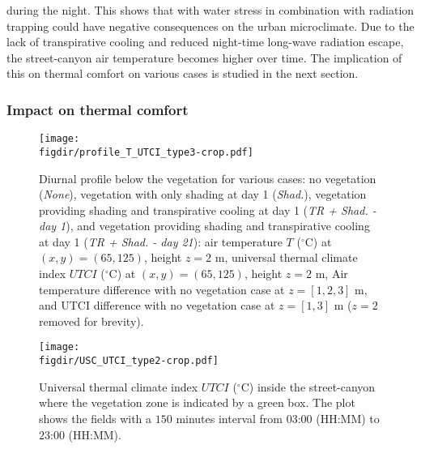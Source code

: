 during the night. This shows that with water stress in combination with radiation trapping could have negative consequences on the urban microclimate. Due to the lack of transpirative cooling and reduced night-time long-wave radiation escape, the street-canyon air temperature becomes higher over time. The implication of this on thermal comfort on various cases is studied in the next section.
	
	
%
%
%
%


\subsubsection*{Impact on thermal comfort}

\begin{figure}[p]
	\centering
	\texttt{[image: \\figdir/profile\_T\_UTCI\_type3-crop.pdf]}
	\caption{Diurnal profile below the vegetation for various cases: no vegetation (\textit{None}), vegetation with only shading at day 1 (\textit{Shad.}), vegetation providing shading and transpirative cooling at day 1 (\textit{TR + Shad. - day 1}), and vegetation providing shading and transpirative cooling at day 1 (\textit{TR + Shad. - day 21}):  air temperature $T$ ($^{\circ}$C) at $(x,y) = (65, 125)$, height $z=2$ m,  universal thermal climate index $\textit{UTCI}$ ($^{\circ}$C) at $(x,y) = (65, 125)$, height $z=2$ m,  Air temperature difference with no vegetation case at $z=[1,2,3]$ m, and  UTCI difference with no vegetation case at $z=[1,3]$ m ($z=2$ removed for brevity).}
	\label{fig:profile_T_UTCI}
\end{figure}

\begin{sidewaysfigure}[p]
	\centering
	\texttt{[image: \\figdir/USC\_UTCI\_type2-crop.pdf]}
	\caption{Universal thermal climate index $\textit{UTCI}$ ($^{\circ}$C) inside the street-canyon where the vegetation zone is indicated by a green box. The plot shows the fields with a $150$ minutes interval from $03$:$00$ (HH:MM) to $23$:$00$ (HH:MM).}
	\label{fig:USC_UTCI}
\end{sidewaysfigure}

